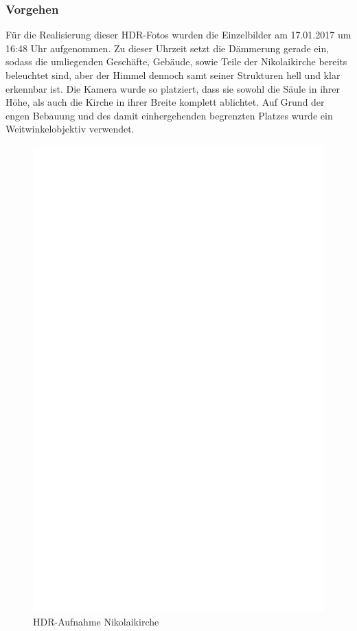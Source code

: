 \documentclass[liststotoc,bibtotoc,fontsize=14pt,]{scrreprt}
\begin{document}
\subsubsection{Vorgehen}
Für die Realisierung dieser HDR-Fotos wurden die Einzelbilder am 17.01.2017 um 16:48 Uhr aufgenommen. Zu dieser Uhrzeit setzt die Dämmerung gerade ein, sodass die umliegenden Geschäfte, Gebäude, sowie Teile der Nikolaikirche bereits beleuchtet sind, aber der Himmel dennoch samt seiner Strukturen hell und klar erkennbar ist.  Die Kamera wurde so platziert, dass sie sowohl die Säule in ihrer Höhe, als auch die Kirche in ihrer Breite komplett ablichtet. Auf Grund der engen Bebauung und des damit einhergehenden begrenzten Platzes wurde ein Weitwinkelobjektiv verwendet. 
\newpage
\begin{figure}[h]
	\includegraphics[width=\linewidth]{img/ph.jpg}
	\caption{HDR-Aufnahme Nikolaikirche}
\end{figure}
	
\end{document}
